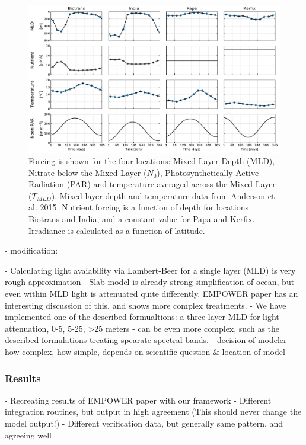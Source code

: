 \documentclass[journal abbreviation, manuscript]{copernicus}
\begin{document}
\begin{figure}[t]
\includegraphics[width=15cm]{Figures/firstdraft_plots/02_EMPOWER_forcing.pdf}
\caption{Forcing is shown for the four locations: Mixed Layer Depth (MLD), Nitrate below the Mixed Layer ($N_0$), Photosynthetically Active Radiation (PAR) and temperature averaged across the Mixed Layer ($T_{MLD}$). Mixed layer depth and temperature data from Anderson et al. 2015. Nutrient forcing is a function of depth for locations Biotrans and India, and a constant value for Papa and Kerfix. Irradiance is calculated as a function of latitude.}
\label{Figure:EMPOWERforcing}
\end{figure}


- modification:

- Calculating light avaiability via Lambert-Beer for a single layer (MLD) is very rough approximation
- Slab model is already strong simplification of ocean, but even within MLD light is attenuated quite differently. EMPOWER paper has an interesting discussion of this, and shows more complex treatments.
- We have implemented one of the described formualtions: a three-layer MLD for light attenuation, 0-5, 5-25, >25 meters
- can be even more complex, such as the described formulations treating spearate spectral bands.
- decision of modeler how complex, how simple, depends on scientific question & location of model




\subsubsection{Results}
- Recreating results of EMPOWER paper with our framework
- Different integration routines, but output in high agreement (This should never change the model output!)
- Different verification data, but generally same pattern, and agreeing well 
\end{document}
